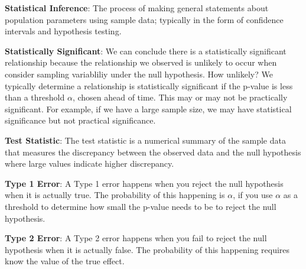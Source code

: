 \documentclass[
]{book}
\begin{document}
\textbf{Statistical Inference}: The process of making general statements about population parameters using sample data; typically in the form of confidence intervals and hypothesis testing.

\textbf{Statistically Significant}: We can conclude there is a statistically significant relationship because the relationship we observed is unlikely to occur when consider sampling variabliliy under the null hypothesis. How unlikely? We typically determine a relationship is statistically significant if the p-value is less than a threshold \(\alpha\), chosen ahead of time. This may or may not be practically significant. For example, if we have a large sample size, we may have statistical significance but not practical significance.

\textbf{Test Statistic}: The test statistic is a numerical summary of the sample data that measures the discrepancy between the observed data and the null hypothesis where large values indicate higher discrepancy.

\textbf{Type 1 Error}: A Type 1 error happens when you reject the null hypothesis when it is actually true. The probability of this happening is \(\alpha\), if you use \(\alpha\) as a threshold to determine how small the p-value needs to be to reject the null hypothesis.

\textbf{Type 2 Error}: A Type 2 error happens when you fail to reject the null hypothesis when it is actually false. The probability of this happening requires know the value of the true effect.
\end{document}
